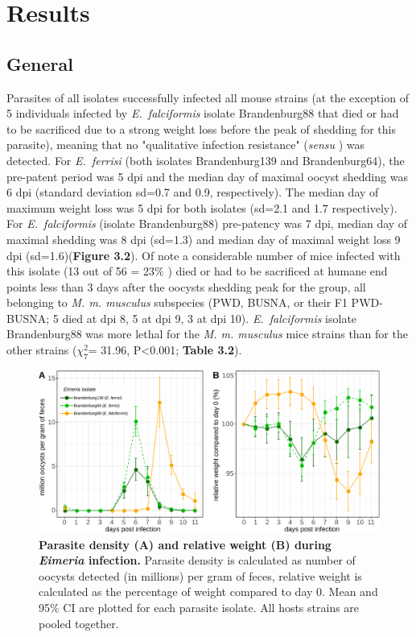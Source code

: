 \section{Results}

\subsection{General}

Parasites of all isolates successfully infected all mouse strains (at the exception of 5 individuals infected by \textit{E.~falciformis} isolate Brandenburg88 that died or had to be sacrificed due to a strong weight loss before the peak of shedding for this parasite), meaning that no "qualitative infection resistance"  (\textit{sensu} \cite{Gandon2000}) was detected. For \textit{E.~ferrisi }(both isolates Brandenburg139 and Brandenburg64), the pre-patent period was 5 dpi and the median day of maximal oocyst shedding was 6 dpi (standard deviation sd=0.7 and 0.9, respectively). The median day of maximum weight loss was 5 dpi for both isolates (sd=2.1 and 1.7 respectively). For \textit{E.~falciformis} (isolate Brandenburg88) pre-patency was 7 dpi, median day of maximal shedding was 8 dpi (sd=1.3) and median day of maximal weight loss 9 dpi (sd=1.6)(\textbf{Figure 3.2}). Of note a considerable number of mice infected with this isolate (13 out of 56 = 23$\%$ ) died or had to be sacrificed at humane end points less than 3 days after the oocysts shedding peak for the group, all belonging to \textit{M. m. musculus} subspecies (PWD, BUSNA, or their F1 PWD-BUSNA; 5 died at dpi 8, 5 at dpi 9, 3 at dpi 10). \textit{E.~falciformis }isolate Brandenburg88 was more lethal for the \textit{M. m. musculus} mice strains than for the other strains ($\chi_{7}^{2}$= 31.96, P<0.001; \textbf{Table 3.2}).\par

\begin{figure}[H]
    \centering
    \includegraphics[width=\linewidth,height=\textheight,keepaspectratio]{images/3article2/Fig2_final.pdf}
    \caption{\textbf{Parasite density (A) and relative weight (B) during \textit{Eimeria} infection.} Parasite density is calculated as number of oocysts detected (in millions) per gram of feces, relative weight is calculated as the percentage of weight compared to day 0. Mean and 95\% CI are plotted for each parasite isolate. All hosts strains are pooled together.}
\end{figure}

